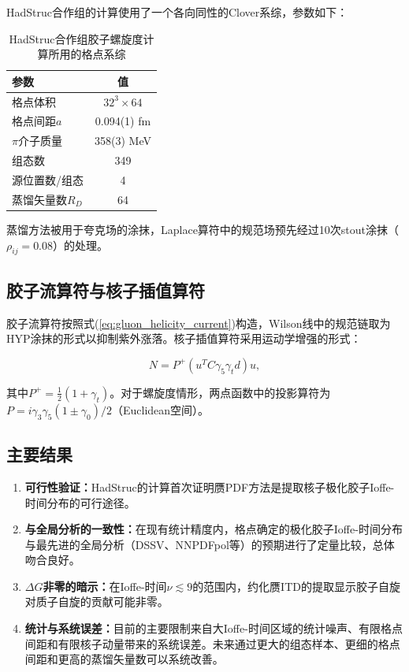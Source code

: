 \documentclass[12pt,a4paper]{ctexart}
\theoremstyle{definition}
\begin{document}
HadStruc合作组的计算\cite{Egerer2022}使用了一个各向同性的Clover系综，参数如下：

\begin{table}[H]
\centering
\caption{HadStruc合作组胶子螺旋度计算所用的格点系综\cite{Egerer2022}}
\label{tab:ensemble}
\begin{tabular}{lc}
\toprule
参数 & 值 \\
\midrule
格点体积        & $32^3 \times 64$ \\
格点间距$a$     & 0.094(1) fm \\
$\pi$介子质量   & 358(3) MeV \\
组态数          & 349 \\
源位置数/组态  & 4 \\
蒸馏矢量数$R_D$ & 64 \\
\bottomrule
\end{tabular}
\end{table}

蒸馏方法\cite{Peardon2009}被用于夸克场的涂抹，Laplace算符中的规范场预先经过10次stout涂抹（$\rho_{ij} = 0.08$）的处理。

\subsection{胶子流算符与核子插值算符}

胶子流算符按照式(\ref{eq:gluon_helicity_current})构造，Wilson线中的规范链取为HYP涂抹的形式以抑制紫外涨落\cite{Egerer2022}。核子插值算符采用运动学增强的形式\cite{Zhang2025kinematic}：

\begin{equation}
N = P^+(u^T C\gamma_5\gamma_t d)u,
\label{eq:nucleon_interpolator}
\end{equation}

其中$P^+ = \frac{1}{2}(1+\gamma_t)$。对于螺旋度情形，两点函数中的投影算符为$P = i\gamma_3\gamma_5(1 \pm \gamma_0)/2$（Euclidean空间）\cite{NoteGluonPDFs}。

\subsection{主要结果}

\begin{enumerate}
    \item \textbf{可行性验证：}HadStruc的计算\cite{Egerer2022}首次证明赝PDF方法是提取核子极化胶子Ioffe-时间分布的可行途径。

    \item \textbf{与全局分析的一致性：}在现有统计精度内，格点确定的极化胶子Ioffe-时间分布与最先进的全局分析（DSSV、NNPDFpol等）的预期进行了定量比较，总体吻合良好\cite{Egerer2022}。

    \item \textbf{$\Delta G$非零的暗示：}在Ioffe-时间$\nu \lesssim 9$的范围内，约化赝ITD的提取显示胶子自旋对质子自旋的贡献可能非零\cite{Egerer2022}。

    \item \textbf{统计与系统误差：}目前的主要限制来自大Ioffe-时间区域的统计噪声、有限格点间距和有限核子动量带来的系统误差。未来通过更大的组态样本、更细的格点间距和更高的蒸馏矢量数可以系统改善\cite{Egerer2022}。
\end{enumerate}
\end{document}

